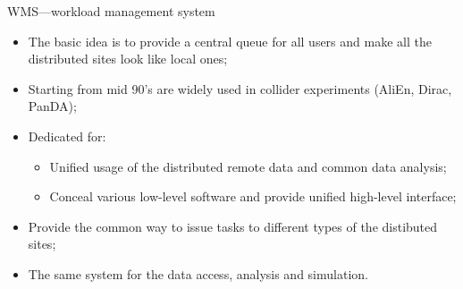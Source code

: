 \documentclass[18pt]{beamer}
\begin{document}
\begin{frame}{WMS---workload management system}
\begin{itemize}
  \item The basic idea is to provide a central queue for all users and make all the distributed sites look like local ones;
  \item Starting from mid 90's are widely used in collider experiments (AliEn, Dirac, PanDA);
  \item Dedicated for:
  \begin{itemize}
  \item Unified usage of the distributed remote data and common data analysis;
  \item Conceal various low-level software and provide unified high-level interface;
  \end{itemize}
  \item Provide the common way to issue tasks to different types of the distibuted sites;
  \item
  The same system for the data access, analysis and simulation.
\end{itemize}
\end{frame}
\end{document}
